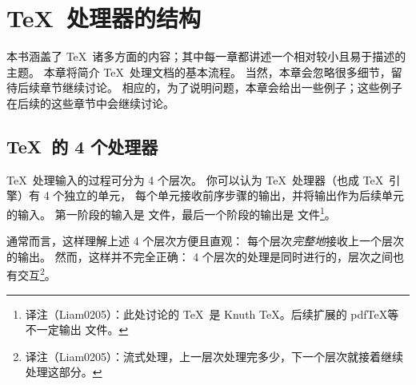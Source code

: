 \documentclass{book}
\begin{document}
\chapter{\TeX\ 处理器的结构}

本书涵盖了 \TeX\ 诸多方面的内容；其中每一章都讲述一个相对较小且易于描述的主题。
本章将简介 \TeX\ 处理文档的基本流程。
当然，本章会忽略很多细节，留待后续章节继续讨论。
相应的，为了说明问题，本章会给出一些例子；这些例子在后续的这些章节中会继续讨论。

\section{\TeX\ 的 4 个处理器}

\TeX\ 处理输入的过程可分为 4 个层次。
你可以认为 \TeX\ 处理器（也成 \TeX\ 引擎）有 4 个独立的单元，
每个单元接收前序步骤的输出，并将输出作为后续单元的输入。
第一阶段的输入是  文件，最后一个阶段的输出是  文件\footnote{译注（Liam0205）：此处讨论的 \TeX\ 是 Knuth \TeX。后续扩展的 pdf\TeX 等不一定输出  文件。}。%

通常而言，这样理解上述 4 个层次方便且直观：
每个层次\emph{完整地}接收上一个层次的输出。
然而，这样并不完全正确：
4 个层次的处理是同时进行的，层次之间也有交互\footnote{译注（Liam0205）：流式处理，上一层次处理完多少，下一个层次就接着继续处理这部分。}。
\end{document}
